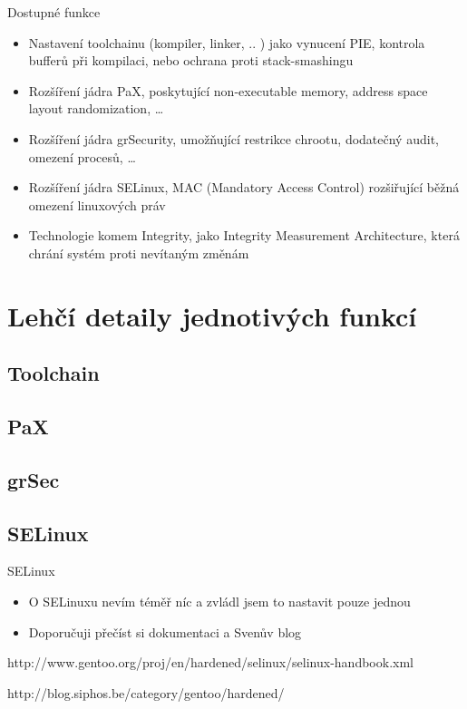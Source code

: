 \documentclass{beamer}
\begin{document}
\begin{frame}{Dostupné funkce}
	\begin{itemize}
		\item Nastavení toolchainu (kompiler, linker, .. ) jako vynucení PIE, kontrola bufferů při kompilaci, nebo ochrana proti stack-smashingu
		\item Rozšíření jádra PaX, poskytující non-executable memory, address space layout randomization, \ldots
		\item Rozšíření jádra grSecurity, umožňující restrikce chrootu, dodatečný audit, omezení procesů, \ldots
		\item Rozšíření jádra SELinux, MAC (Mandatory Access Control) rozšiřující běžná omezení linuxových práv
		\item Technologie komem Integrity, jako Integrity Measurement Architecture, která chrání systém proti nevítaným změnám
	\end{itemize}
\end{frame}

\section{Lehčí detaily jednotivých funkcí}

\subsection{Toolchain}

\subsection{PaX}

\subsection{grSec}

\subsection{SELinux}

\begin{frame}{SELinux}
	\begin{itemize}
		\item O SELinuxu nevím téměř níc a zvládl jsem to nastavit pouze jednou
		\item Doporučuji přečíst si dokumentaci a Svenův blog
	\end{itemize}
	\begin{center}http://www.gentoo.org/proj/en/hardened/selinux/selinux-handbook.xml\end{center}
	\begin{center}http://blog.siphos.be/category/gentoo/hardened/\end{center}
\end{frame}
\end{document}
